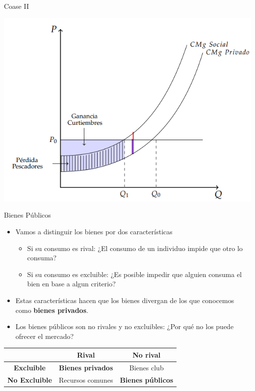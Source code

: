 \documentclass{beamer}
\begin{document}
\begin{frame}{Coase II}
    \begin{center}
        \includegraphics[scale=0.7]{../Figures/C25.7.png}
    \end{center}
\end{frame}

\begin{frame}{Bienes Públicos}
    \begin{itemize}
        \item Vamos a distinguir los bienes por dos características
        \begin{itemize}
            \item Si su consumo es rival: ¿El consumo de un individuo impide que otro lo consuma?
            \item Si su consumo es excluible: ¿Es posible impedir que alguien consuma el bien en base a algun criterio?
        \end{itemize}
        \item Estas características hacen que los bienes divergan de los que conocemos como \textbf{bienes privados}.
        \item Los bienes públicos son no rivales y no excluibles: ¿Por qué no los puede ofrecer el mercado?
    \end{itemize}
    \begin{table}[]
        \centering
        \begin{tabular}{|c|c|c|}
    \hline
                        & \textbf{Rival}   & \textbf{No rival} \\ \hline
    \textbf{Excluible}    & \textbf{Bienes privados}  & Bienes club       \\ \hline
    \textbf{No Excluible} & Recursos comunes & \textbf{Bienes públicos}   \\ \hline
    \end{tabular}
    \end{table}
\end{frame}
\end{document}

